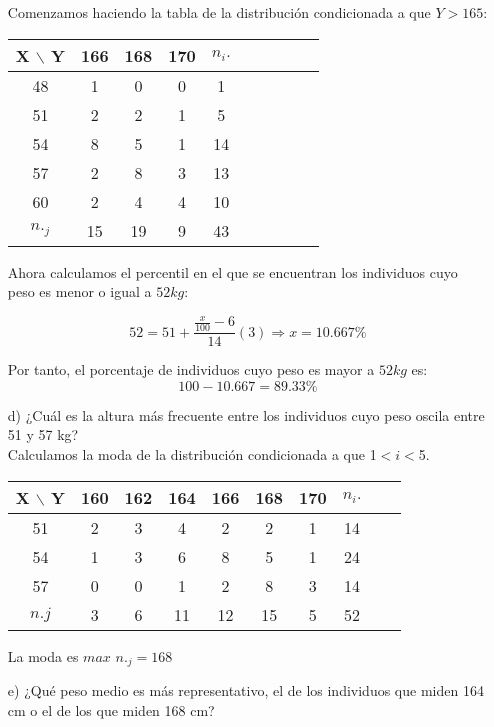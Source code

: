 \documentclass[a4paper,12pt]{article}
\begin{document}
\begin{enumerate}
    Comenzamos haciendo la tabla de la distribución condicionada a que $Y > 165$:

    \begin{center}
    \begin{tabular}{c|cccccc|ccc}
    X $\backslash$ Y &166 & 168 & 170 & $n_i.$\\
    \hline
    48 & 1 & 0 & 0 & 1\\
    51 & 2 & 2 & 1 & 5\\
    54 & 8 & 5 & 1 & 14\\
    57 & 2 & 8 & 3 & 13\\
    60 & 2 & 4 & 4 & 10\\
    \hline
    $n._j$ & 15 & 19 & 9 & 43\\
    \end{tabular}
    \end{center}

    Ahora calculamos el percentil en el que se encuentran los individuos cuyo peso es menor o igual a $52kg$:

    $$52 = 51 + \frac{\frac{x}{100}- 6}{14}(3) \Rightarrow x = 10.667\% $$

    Por tanto, el porcentaje de individuos cuyo peso es mayor a $52kg$ es:
    $$100 - 10.667=89.33\%$$
    
    \item[d)] ¿Cuál es la altura más frecuente entre los individuos cuyo peso oscila entre 51 y 57 kg?\\
    Calculamos la moda de la distribución condicionada a que 1$<i<$5.

    \begin{center}
    \begin{tabular}{c|cccccc|ccc}
    X $\backslash$ Y & 160 & 162 & 164 & 166 & 168 & 170 & $n_i.$\\
    \hline
    51 & 2 & 3 & 4 & 2 & 2 & 1 & 14\\
    54 & 1 & 3 & 6 & 8 & 5 & 1 & 24\\
    57 & 0 & 0 & 1 & 2 & 8 & 3 & 14\\
    \hline
    $n.j$ & 3 & 6 & 11 & 12 & 15 & 5 & 52 \\
    \end{tabular}
    \end{center}

    La moda es $max$ {$n._j$}$=168$
    
    \item[e)] ¿Qué peso medio es más representativo, el de los individuos que miden 164 cm o el de los que miden 168 cm?\\


\end{enumerate}
\end{document}
